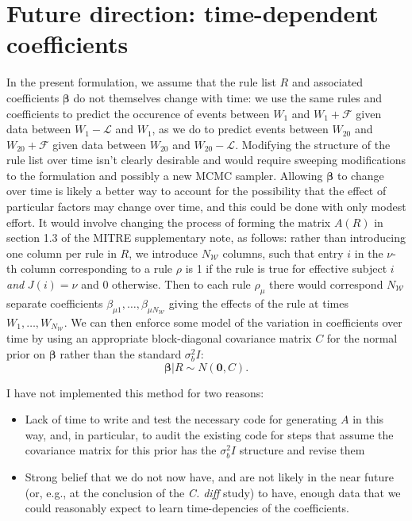 \documentclass[12pt]{article}
\begin{document}
\section{Future direction: time-dependent coefficients}
In the present formulation, we assume that the rule list $R$ and
associated coefficients $\boldsymbol \beta$ do not themselves change
with time: we use the same rules and coefficients to predict the
occurence of events between $W_1$ and $W_1 + \mathcal F$ given data
between $W_1 - \mathcal L$ and $W_1$, as we do to predict events
between $W_{20}$ and $W_{20} + \mathcal F$ given data between $W_{20}$
and $W_{20}-\mathcal L$. Modifying the structure of the rule list over
time isn't clearly desirable and would require sweeping modifications
to the formulation and possibly a new MCMC sampler. Allowing
$\boldsymbol \beta$ to change over time is likely a better way to
account for the possibility that the effect of particular factors may
change over time, and this could be done with only modest effort. It
would involve changing the process of forming the matrix $A(R)$ in
section 1.3 of the MITRE supplementary note, as follows: rather than
introducing one column per rule in $R$, we introduce $N_\mathcal W$
columns, such that entry $i$ in the $\nu$-th column corresponding to a
rule $\rho$ is 1 if the rule is true for effective subject $i$
\textit{and} $J(i) = \nu$ and 0 otherwise. Then to each rule
$\rho_\mu$ there would correspond $N_\mathcal W$ separate coefficients
$\beta_{\mu 1}, \ldots, \beta_{\mu {N_\mathcal W}}$ giving the effects
of the rule at times $W_1, \ldots, W_{N_\mathcal W}$. We can then
enforce some model of the variation in coefficients over time by using
an appropriate block-diagonal covariance matrix $C$ for the normal prior on
$\boldsymbol \beta$ rather than the standard $\sigma^2_b I$:
\[ \boldsymbol \beta \vert R \sim N(\mathbf 0, C).\]

I have not implemented this method for two reasons:
\begin{itemize}
\item Lack of time to write and test the necessary code for generating
  $A$ in this way, and, in particular, to audit the existing code for
  steps that assume the covariance matrix for this prior has the
  $\sigma^2_b I$ structure and revise them
\item Strong belief that we do not now have, and are not likely in the
  near future (or, e.g., at the conclusion of the \textit{C. diff}
  study) to have, enough data that we could reasonably expect to learn
  time-depencies of the coefficients.
\end{itemize}
\end{document}
